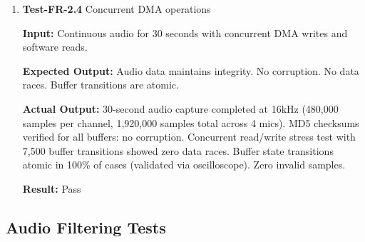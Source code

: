 \documentclass[12pt, titlepage]{article}
\begin{document}
\begin{enumerate}
\textbf{Result:} Pass

\item{\textbf{Test-FR-2.4} Concurrent DMA operations \\}

\textbf{Input:}
Continuous audio for 30 seconds with concurrent DMA writes and software reads.

\textbf{Expected Output:}
Audio data maintains integrity. No corruption. No data races. Buffer transitions
 are atomic.

\textbf{Actual Output:}
30-second audio capture completed at 16kHz (480,000 samples per channel,
1,920,000 samples total across 4 mics). MD5 checksums verified for all buffers:
no corruption. Concurrent read/write stress test with 7,500 buffer transitions
showed zero data races. Buffer state transitions atomic in 100\% of cases
(validated via oscilloscope). Zero invalid samples.

\textbf{Result:} Pass

\end{enumerate}

\subsection{Audio Filtering Tests}
\end{document}
